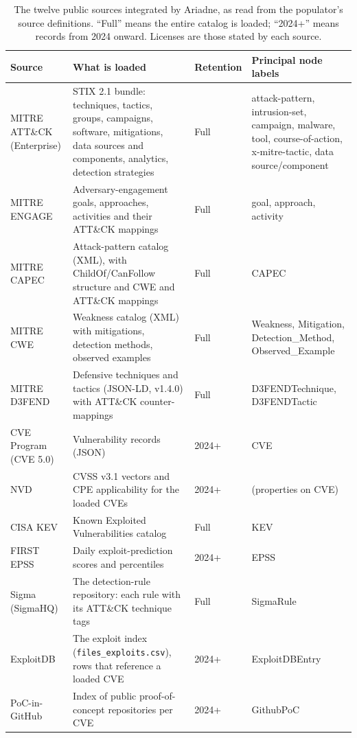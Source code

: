 \documentclass[preprint,12pt,authoryear]{elsarticle}
\begin{document}
\begin{table}[!htbp]
\centering\footnotesize
\caption{The twelve public sources integrated by Ariadne, as read from the populator's source definitions. ``Full'' means the entire catalog is loaded; ``2024+'' means records from 2024 onward. Licenses are those stated by each source.}\label{tab:sources}
\begin{tabularx}{\textwidth}{@{}p{2.9cm}Xp{1.2cm}p{3.6cm}@{}}
\toprule Source & What is loaded & Retention & Principal node labels \\\midrule
MITRE ATT\&CK (Enterprise) & STIX 2.1 bundle: techniques, tactics, groups, campaigns, software, mitigations, data sources and components, analytics, detection strategies & Full & attack-pattern, intrusion-set, campaign, malware, tool, course-of-action, x-mitre-tactic, data source/component \\
MITRE ENGAGE & Adversary-engagement goals, approaches, activities and their ATT\&CK mappings & Full & goal, approach, activity \\
MITRE CAPEC & Attack-pattern catalog (XML), with ChildOf/CanFollow structure and CWE and ATT\&CK mappings & Full & CAPEC \\
MITRE CWE & Weakness catalog (XML) with mitigations, detection methods, observed examples & Full & Weakness, Mitigation, Detection\_Method, Observed\_Example \\
MITRE D3FEND & Defensive techniques and tactics (JSON-LD, v1.4.0) with ATT\&CK counter-mappings & Full & D3FENDTechnique, D3FENDTactic \\
CVE Program (CVE 5.0) & Vulnerability records (JSON) & 2024+ & CVE \\
NVD & CVSS v3.1 vectors and CPE applicability for the loaded CVEs & 2024+ & (properties on CVE) \\
CISA KEV & Known Exploited Vulnerabilities catalog & Full & KEV \\
FIRST EPSS & Daily exploit-prediction scores and percentiles & 2024+ & EPSS \\
Sigma (SigmaHQ) & The detection-rule repository: each rule with its ATT\&CK technique tags & Full & SigmaRule \\
ExploitDB & The exploit index (\texttt{files\_exploits.csv}), rows that reference a loaded CVE & 2024+ & ExploitDBEntry \\
PoC-in-GitHub & Index of public proof-of-concept repositories per CVE & 2024+ & GithubPoC \\
\bottomrule
\end{tabularx}
\end{table}
\end{document}
